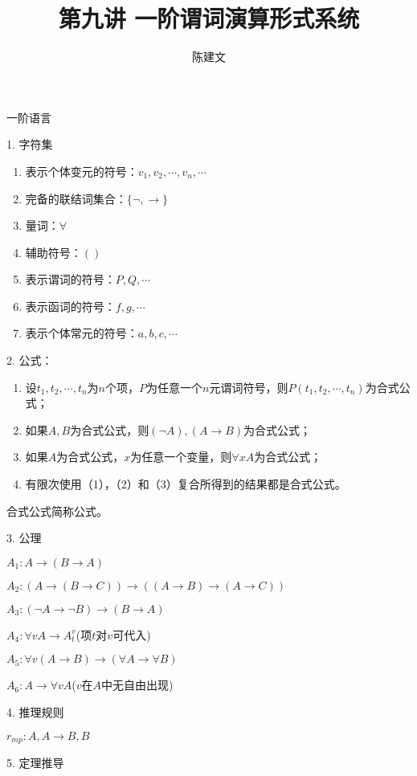 \documentclass{article}
\begin{document}
\begin{CJK*}{UTF8}{gbsn}
  \title{第九讲 一阶谓词演算形式系统}
  \author{陈建文}
  \maketitle
一阶语言

    1. 字符集
    \begin{enumerate}
      \item 表示个体变元的符号：$v_1,v_2,\cdots,v_n,\cdots$
      \item 完备的联结词集合：$\{\lnot, \to\}$
      \item 量词：$\forall$
      \item 辅助符号：$()$
      \item 表示谓词的符号：$P,Q,\cdots$
      \item 表示函词的符号：$f,g,\cdots$
      \item 表示个体常元的符号：$a,b,c,\cdots$
    \end{enumerate}

    2. 公式：

      \begin{enumerate}
        \item 设$t_1,t_2,\cdots,t_n$为$n$个项，$P$为任意一个$n$元谓词符号，则$P(t_1,t_2,\cdots,t_n)$为合式公式；
        \item 如果$A,B$为合式公式，则$(\lnot A),(A\to B)$为合式公式；
        \item 如果$A$为合式公式，$x$为任意一个变量，则$\forall xA$为合式公式；     
        \item 有限次使用（1），（2）和（3）复合所得到的结果都是合式公式。
      \end{enumerate}

    合式公式简称公式。

    3. 公理  
  
    $A_1:A\to(B\to A)$

    $A_2:(A\to(B\to C))\to((A\to B)\to (A\to C))$

    $A_3:(\lnot A\to \lnot B)\to (B \to A)$

    $A_4:\forall v A\to A^v_t$(项$t$对$v$可代入)

    $A_5:\forall v(A\to B)\to (\forall A\to \forall B)$

    $A_6:A\to\forall v A$($v$在$A$中无自由出现)

    4. 推理规则 
    
    $r_{mp}:A,A\to B, B$

    5. 定理推导
    


\end{CJK*}
\end{document}
